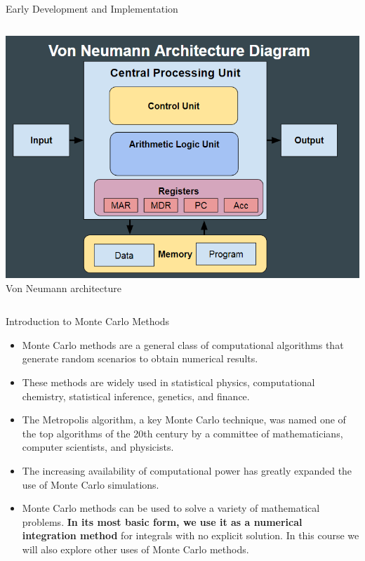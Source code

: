 \documentclass[8pt]{beamer}
\begin{document}
\begin{frame}{Early Development and Implementation}
\begin{columns}
\begin{column}{0.35\textwidth}
\begin{center}
        \includegraphics[width=\textwidth]{von-neumann-architecture-gcse-ocr.png} %
        \\[0.5em]
        \footnotesize Von Neumann architecture
        \end{center}
    \end{column}
\end{columns}
\end{frame}

\begin{frame}{Introduction to Monte Carlo Methods}

\begin{itemize}
	\item Monte Carlo methods are a general class of computational algorithms that generate random scenarios to obtain  numerical results.
	\vspace{2mm}
    \item These methods are widely used in statistical physics, computational chemistry, statistical inference, genetics, and finance.
	\vspace{2mm}
    \item The Metropolis algorithm, a key Monte Carlo technique, was named one of the top algorithms of the 20th century by a committee of mathematicians, computer scientists, and physicists.
    \vspace{2mm}
    \item The increasing availability of computational power has greatly expanded the use of Monte Carlo simulations.
    \vspace{2mm}
    \item Monte Carlo methods can be used to solve a variety of mathematical problems. \textbf{In its most basic form, we use it as a numerical integration method} for integrals with no explicit solution. In this course we will also explore other uses of Monte Carlo methods.
\end{itemize}
\end{frame}
\end{document}
